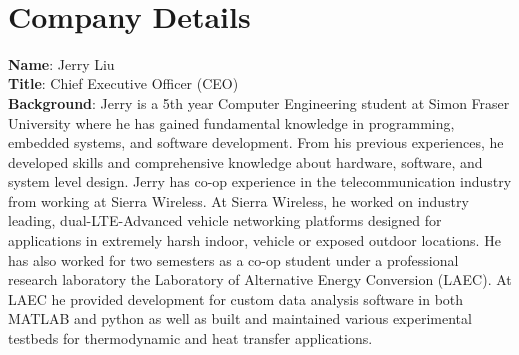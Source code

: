 

\setcounter{section}{5}
\
\section{Company Details}
\bigskip



\textbf{Name}: Jerry Liu \\
\medskip
\textbf{Title}: Chief Executive Officer (CEO) \\
\medskip
\textbf{Background}: Jerry is a 5th year Computer Engineering student at Simon Fraser University where he has gained fundamental knowledge in programming, embedded systems, and  software development. From his previous experiences, he developed skills and comprehensive knowledge about hardware, software, and system level design. Jerry has co-op experience in the telecommunication industry from working at Sierra Wireless. At Sierra Wireless, he worked on industry leading, dual-LTE-Advanced vehicle networking platforms designed for applications in extremely harsh indoor, vehicle or exposed outdoor locations. He has also worked for two semesters as a co-op student under a professional research laboratory the Laboratory of Alternative Energy Conversion (LAEC). At LAEC he provided development for custom data analysis software in both MATLAB and python as well as built and maintained various experimental testbeds for thermodynamic and heat transfer applications.